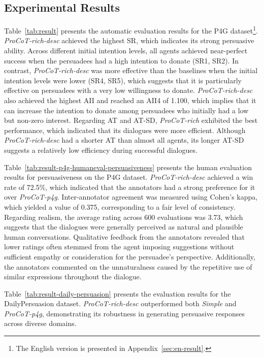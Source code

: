 \documentclass[11pt]{article}
\begin{document}
\subsection{Experimental Results}
Table~\ref{tab:result} presents the automatic evaluation results for the P4G dataset\footnote{The English version is presented in Appendix~\ref{sec:en-result}.}.
\textit{ProCoT-rich-desc} achieved the highest SR, which indicates its strong persuasive ability. 
Across different initial intention levels, all agents achieved near-perfect success when the persuadees had a high intention to donate (SR1, SR2). 
In contrast, \textit{ProCoT-rich-desc} was more effective than the baselines when the initial intention levels were lower (SR4, SR5), which suggests that it is particularly effective on persuadees with a very low willingness to donate.
\textit{ProCoT-rich-desc} also achieved the highest AII and reached an AII4 of 1.100, which implies that it can increase the intention to donate among persuadees who initially had a low but non-zero interest.
Regarding AT and AT-SD, \textit{ProCoT-rich} exhibited the best performance, which indicated that its dialogues were more efficient.
Although \textit{ProCoT-rich-desc} had a shorter AT than almost all agents, its longer AT-SD suggests a relatively low efficiency during successful dialogues. 



Table~\ref{tab:result-p4g-humaneval-persuasiveness} presents the human evaluation results for persuasiveness on the P4G dataset.
\textit{ProCoT-rich-desc} achieved a win rate of 72.5\%, which indicated that the annotators had a strong preference for it over \textit{ProCoT-p4g}.
Inter-annotator agreement was measured using Cohen's kappa, which yielded a value of 0.375, corresponding to a fair level of consistency.
Regarding realism, the average rating across 600 evaluations was 3.73, which suggests that the dialogues were generally perceived as natural and plausible human conversations.
Qualitative feedback from the annotators revealed that lower ratings often stemmed from the agent imposing suggestions without sufficient empathy or consideration for the persuadee's perspective.
Additionally, the annotators commented on the unnaturalness caused by the repetitive use of similar expressions throughout the dialogue.


Table~\ref{tab:result-daily-persuasion} presents the evaluation results for the DailyPersuasion dataset. 
\textit{ProCoT-rich-desc} outperformed both \textit{Simple} and \textit{ProCoT-p4g}, demonstrating its robustness in generating persuasive responses across diverse domains.
\end{document}

